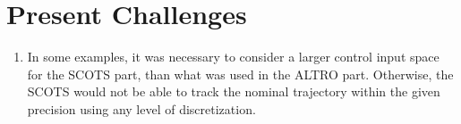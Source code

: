 \section{Present Challenges}

\begin{enumerate}
	\item In some examples, it was necessary to consider a larger control input space for the SCOTS part, than what was used in the ALTRO part.
	Otherwise, the SCOTS would not be able to track the nominal trajectory within the given precision using any level of discretization. 
\end{enumerate}



